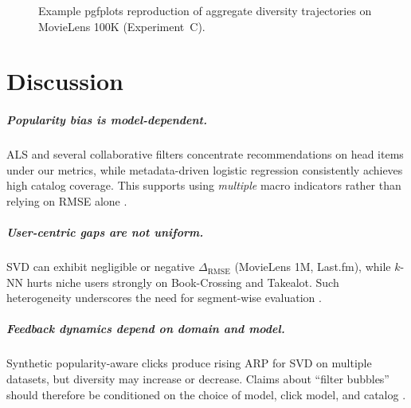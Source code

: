 \documentclass[11pt,a4paper,twoside,openright]{report}
\begin{document}
\begin{figure}[htbp]
  \centering
  \caption{Example pgfplots reproduction of aggregate diversity trajectories on MovieLens 100K (Experiment~C).}
  \label{fig:pgfdiv}
\end{figure}

\chapter{Discussion}

\paragraph{Popularity bias is model-dependent.}
ALS and several collaborative filters concentrate recommendations on head items under our metrics, while metadata-driven logistic regression consistently achieves high catalog coverage. This supports using \emph{multiple} macro indicators rather than relying on RMSE alone \citep{abdollahpouri2019managing,cremonesi2010accuracy}.

\paragraph{User-centric gaps are not uniform.}
SVD can exhibit negligible or negative $\Delta_{\mathrm{RMSE}}$ (MovieLens 1M, Last.fm), while $k$-NN hurts niche users strongly on Book-Crossing and Takealot. Such heterogeneity underscores the need for segment-wise evaluation \citep{ekstrand2018fairness}.

\paragraph{Feedback dynamics depend on domain and model.}
Synthetic popularity-aware clicks produce rising ARP for SVD on multiple datasets, but diversity may increase or decrease. Claims about ``filter bubbles'' should therefore be conditioned on the choice of model, click model, and catalog \citep{chaney2018algorithmic,mansoury2020feedback}.
\end{document}
